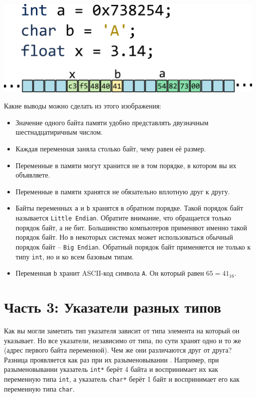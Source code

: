 \documentclass{article}
\begin{document}
\begin{center}
\includegraphics[scale=1]{../images/memory/memory_2_different_types.png}
\end{center}
Какие выводы можно сделать из этого изображения:
\begin{itemize}
\item Значение одного байта памяти удобно представлять двузначным шестнадцатиричным числом.
\item Каждая переменная заняла столько байт, чему равен её размер.
\item Переменные в памяти могут хранится не в том порядке, в котором вы их объявляете.
\item Переменные в памяти хранятся не обязательно вплотную друг к другу.
\item Байты переменных \texttt{a} и \texttt{b} хранятся в обратном порядке. Такой порядок байт называется \texttt{Little Endian}.  Обратите внимание, что обращается только порядок байт, а не бит. Большинство компьютеров применяют именно такой порядок байт. Но в некоторых системах может использоваться обычный порядок байт -- \texttt{Big Endian}. Обратный порядок байт применяется не только к типу \texttt{int}, но и ко всем базовым типам.
\item Переменная \texttt{b} хранит ASCII-код символа \texttt{A}. Он который равен $65 = 41_{16}$.
\end{itemize}

\section*{Часть 3: Указатели разных типов}
Как вы могли заметить тип указателя зависит от типа элемента на который он указывает. Но все указатели, независимо от типа, по сути хранят одно и то же (адрес первого байта переменной). Чем же они различаются друг от друга? Разница проявляется как раз при их разыменовывании . Например, при разыменовывании указатель \texttt{int*} берёт 4 байта и воспринимает их как переменную типа \texttt{int}, а указатель \texttt{char*} берёт 1 байт и воспринимает его как переменную типа \texttt{char}.\\
\end{document}
